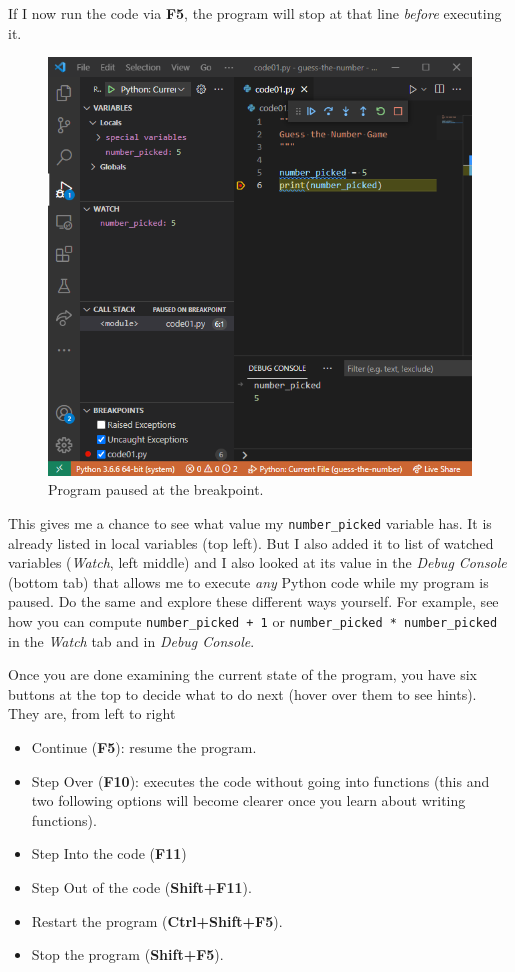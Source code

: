 \documentclass[
]{book}
\providecommand{\tightlist}{%
  \setlength{\itemsep}{0pt}\setlength{\parskip}{0pt}}
\begin{document}
If I now run the code via \textbf{F5}, the program will stop at that line \emph{before} executing it.

\begin{figure}
\centering
\includegraphics{images/debug-pause.png}
\caption{Program paused at the breakpoint.}
\end{figure}

This gives me a chance to see what value my \texttt{number\_picked} variable has. It is already listed in local variables (top left). But I also added it to list of watched variables (\emph{Watch}, left middle) and I also looked at its value in the \emph{Debug Console} (bottom tab) that allows me to execute \emph{any} Python code while my program is paused. Do the same and explore these different ways yourself. For example, see how you can compute \texttt{number\_picked\ +\ 1} or \texttt{number\_picked\ *\ number\_picked} in the \emph{Watch} tab and in \emph{Debug Console}.

Once you are done examining the current state of the program, you have six buttons at the top to decide what to do next (hover over them to see hints). They are, from left to right

\begin{itemize}
\tightlist
\item
  Continue (\textbf{F5}): resume the program.
\item
  Step Over (\textbf{F10}): executes the code without going into functions (this and two following options will become clearer once you learn about writing functions).
\item
  Step Into the code (\textbf{F11})
\item
  Step Out of the code (\textbf{Shift+F11}).
\item
  Restart the program (\textbf{Ctrl+Shift+F5}).
\item
  Stop the program (\textbf{Shift+F5}).
\end{itemize}
\end{document}
